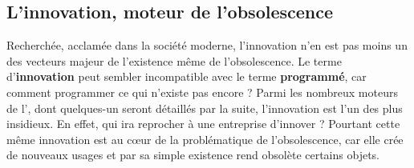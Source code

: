 \subsection{L'innovation, moteur de l'obsolescence}
Recherchée, acclamée dans la société moderne, l'innovation n'en est pas moins un des vecteurs majeur de l'existence même de l'obsolescence. Le terme d'\textbf{innovation} peut sembler incompatible avec le terme \textbf{programmé}, car comment programmer ce qui n'existe pas encore ?
\medbreak
Parmi les nombreux moteurs de l'\op, dont quelques-un seront détaillés par la suite, l'innovation est l'un des plus insidieux. En effet, qui ira reprocher à une entreprise d'innover ? Pourtant cette même innovation est au cœur de la problématique de l'obsolescence, car elle crée de nouveaux usages et par sa simple existence rend obsolète certains objets.
